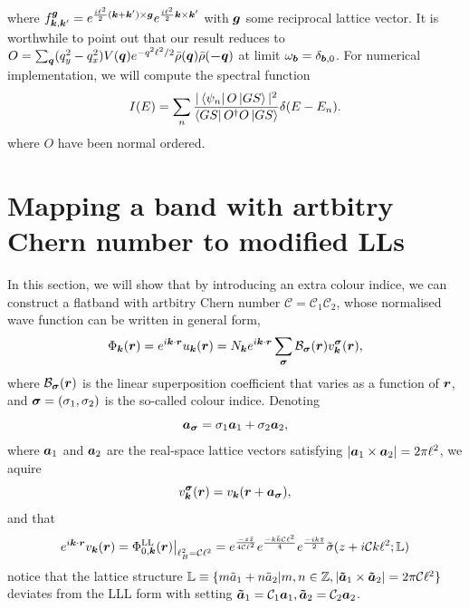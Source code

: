 \documentclass[%
nofootinbib,
 amsmath,amssymb,
 aps,onecolumn,
prb
]{revtex4-2}
\newcommand{\zz}{\bar{z}}
\newcommand{\tilsig}{\tilde{\sigma}}
\newcommand{\tila}{\tilde{a}}
\newcommand{\mB}{\mathcal{B}}
\newcommand{\mC}{\mathcal{C}}
\newcommand{\vsig}{\vb*{\sigma}}
\begin{document}
where $f_{\vb*{k},\vb*{k}^\prime}^{\vb*{g}}=e^{\frac{i\ell^2}{2}(\vb*{k}+\vb*{k}^\prime)\times\vb*{g}}e^{\frac{i\ell^2}{2}\vb*{k}\times\vb*{k}^\prime}$ with $\vb*{g}$ some reciprocal lattice vector. It is worthwhile to point out that our result reduces to 
$O=\sum_{\vb*{q}}(q_y^2-q_x^2)V(\vb*{q})e^{-q^2 \ell^2/2}\bar{\rho}(\vb*{q})\bar{\rho}(\vb*{-q})$ at limit $\omega_{\vb*{b}}=\delta_{\vb*{b},0}$. For numerical implementation, we will compute the spectral function 
\begin{equation}
    I(E)=\sum_{n}\displaystyle\frac{|\bra{\psi_n}O\ket{GS}|^2}{\bra{GS}O^\dag O\ket{GS}}\delta(E-E_n).
\end{equation}
where $O$ have been normal ordered.

\section{Mapping a band with artbitry Chern number to modified LLs}
In this section, we will show that by introducing an extra colour indice, we can construct a flatband with artbitry Chern number $\mC=\mC_1\mC_2$, whose normalised wave function can be written in general form, 
\begin{equation} \label{CNumberWaveFunc}
    \Phi_{\vb*{k}}(\vb*{r})=e^{i{\vb*{k}}\cdot\vb*{r}}u_{\vb*{k}}(\vb*{r})=N_{\vb*{k}}e^{i{\vb*{k}}\cdot\vb*{r}}\sum_{\vb*{\sigma}}\mB_{\vsig}(\vb*{r})v^{\vsig}_{\vb*{k}}(\vb*{r}),
\end{equation}
where $\mB_{\vsig}(\vb*{r})$ is the linear superposition coefficient that varies as a function of $\vb*{r}$, and $\vsig=(\sigma_1,\sigma_2)$ is the so-called colour indice. Denoting 
\begin{equation}
    \vb*{a}_{\vsig}=\sigma_1\vb*{a}_1+\sigma_2\vb*{a}_2,
\end{equation}
where $\vb*{a}_1$ and $\vb*{a}_2$ are the real-space lattice vectors satisfying $|\vb*{a}_1\times\vb*{a}_2|=2\pi\ell^2$, we aquire 
\begin{equation}
    v^{\vsig}_{\vb*{k}}(\vb*{r})=v_{\vb*{k}}(\vb*{r}+\vb*{a}_{\vsig}),
\end{equation}
and that 
\begin{equation}
    e^{i{\vb*{k}}\cdot\vb*{r}}v_{\vb*{k}}(\vb*{r})=\Phi^{\text{LL}}_{0,\vb*{k}}(\vb*{r})\big\vert_{\ell_B^2=\mC\ell^2}=e^{\frac{-z\zz}{4\mC\ell^2}}e^{\frac{-k\bar{k}\mC\ell^2}{4}}e^{\frac{-ik\bar{z}}{2}}\tilsig(z+i\mC k\ell^2;\mathbb{L})
\end{equation}
notice that the lattice structure $\mathbb{L}\equiv\{m\tila_1+n\tila_2|m,n\in\mathbb{Z},|\vb*{\tila}_1\times\vb*{\tila}_2|=2\pi\mC\ell^2\}$ deviates from the LLL form with setting $\vb*{\tila}_1=\mC_1\vb*{a}_1, \vb*{\tila}_2=\mC_2\vb*{a}_2$.
\end{document}

